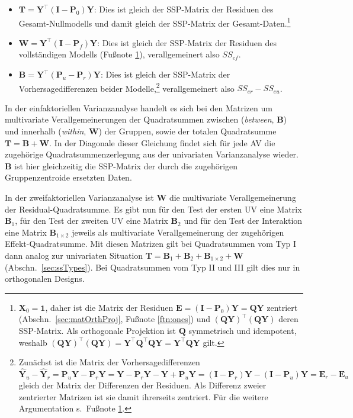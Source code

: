 \begin{itemize}
\item $\bm{T} = \bm{Y}^{\top} (\bm{I} - \bm{P}_{0}) \bm{Y}$: Dies ist gleich der SSP-Matrix der Residuen des Gesamt-Nullmodells und damit gleich der SSP-Matrix der Gesamt-Daten.\footnote{\label{ftn:ssp}$\bm{X}_{0} = \bm{1}$, daher ist die Matrix der Residuen $\bm{E} = (\bm{I} - \bm{P}_{0}) \bm{Y} = \bm{Q} \bm{Y}$ zentriert (Abschn.\ \ref{sec:matOrthProj}, Fußnote \ref{ftn:ones}) und $(\bm{Q} \bm{Y})^{\top} (\bm{Q} \bm{Y})$ deren SSP-Matrix. Als orthogonale Projektion ist $\bm{Q}$ symmetrisch und idempotent, weshalb $(\bm{Q} \bm{Y})^{\top} (\bm{Q} \bm{Y}) = \bm{Y}^{\top} \bm{Q}^{\top} \bm{Q} \bm{Y} = \bm{Y}^{\top} \bm{Q} \bm{Y}$ gilt.}
\item $\bm{W} = \bm{Y}^{\top} (\bm{I} - \bm{P}_{f}) \bm{Y}$: Dies ist gleich der SSP-Matrix der Residuen des vollständigen Modells (Fußnote \ref{ftn:ssp}), verallgemeinert also $SS_{ef}$.
\item $\bm{B} = \bm{Y}^{\top} (\bm{P}_{u} - \bm{P}_{r}) \bm{Y}$: Dies ist gleich der SSP-Matrix der Vorhersagedifferenzen beider Modelle,\footnote{Zunächst ist die Matrix der Vorhersagedifferenzen $\hat{\bm{Y}}_{u} - \hat{\bm{Y}}_{r} = \bm{P}_{u} \bm{Y} - \bm{P}_{r} \bm{Y} = \bm{Y} - \bm{P}_{r} \bm{Y} - \bm{Y} + \bm{P}_{u} \bm{Y} = (\bm{I} - \bm{P}_{r}) \bm{Y} - (\bm{I} - \bm{P}_{u}) \bm{Y} = \bm{E}_{r} - \bm{E}_{u}$ gleich der Matrix der Differenzen der Residuen. Als Differenz zweier zentrierter Matrizen ist sie damit ihrerseits zentriert. Für die weitere Argumentation s.\ Fußnote \ref{ftn:ssp}.} verallgemeinert also $SS_{er} - SS_{eu}$.
\end{itemize}

In der einfaktoriellen Varianzanalyse handelt es sich bei den Matrizen um multivariate Verallgemeinerungen der Quadratsummen zwischen (\emph{between}, $\bm{B}$) und innerhalb (\emph{within}, $\bm{W}$) der Gruppen, sowie der totalen Quadratsumme $\bm{T} = \bm{B} + \bm{W}$. In der Diagonale dieser Gleichung findet sich für jede AV die zugehörige Quadratsummenzerlegung aus der univariaten Varianzanalyse wieder. $\bm{B}$ ist hier gleichzeitig die SSP-Matrix der durch die zugehörigen Gruppenzentroide ersetzten Daten.

In der zweifaktoriellen Varianzanalyse ist $\bm{W}$ die multivariate Verallgemeinerung der Residual-Quadratsumme. Es gibt nun für den Test der ersten UV eine Matrix $\bm{B}_{1}$, für den Test der zweiten UV eine Matrix $\bm{B}_{2}$ und für den Test der Interaktion eine Matrix $\bm{B}_{1 \times 2}$ jeweils als multivariate Verallgemeinerung der zugehörigen Effekt-Quadratsumme. Mit diesen Matrizen gilt bei Quadratsummen vom Typ I dann analog zur univariaten Situation $\bm{T} = \bm{B}_{1} + \bm{B}_{2} + \bm{B}_{1 \times 2} + \bm{W}$ (Abschn.\ \ref{sec:ssTypes}). Bei Quadratsummen vom Typ II und III gilt dies nur in orthogonalen Designs.

